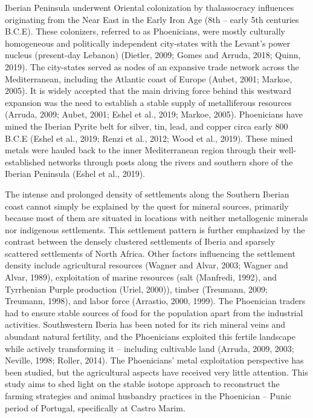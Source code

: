 \documentclass[5p]{elsarticle} %
\begin{document}
Iberian Peninsula underwent Oriental colonization by thalassocracy influences originating from the Near East in the Early Iron Age (8th -- early 5th centuries B.C.E). These colonizers, referred to as Phoenicians, were mostly culturally homogeneous and politically independent city-states with the Levant's power nucleus (present-day Lebanon) (Dietler, 2009; Gomes and Arruda, 2018; Quinn, 2019). The city-states served as nodes of an expansive trade network across the Mediterranean, including the Atlantic coast of Europe (Aubet, 2001; Markoe, 2005). It is widely accepted that the main driving force behind this westward expansion was the need to establish a stable supply of metalliferous resources (Arruda, 2009; Aubet, 2001; Eshel et al., 2019; Markoe, 2005). Phoenicians have mined the Iberian Pyrite belt for silver, tin, lead, and copper circa early 800 B.C.E (Eshel et al., 2019; Renzi et al., 2012; Wood et al., 2019). These mined metals were hauled back to the inner Mediterranean region through their well-established networks through posts along the rivers and southern shore of the Iberian Peninsula (Eshel et al., 2019).

The intense and prolonged density of settlements along the Southern Iberian coast cannot simply be explained by the quest for mineral sources, primarily because most of them are situated in locations with neither metallogenic minerals nor indigenous settlements. This settlement pattern is further emphasized by the contrast between the densely clustered settlements of Iberia and sparsely scattered settlements of North Africa. Other factors influencing the settlement density include agricultural resources (Wagner and Alvar, 2003; Wagner and Alvar, 1989), exploitation of marine resources (salt (Manfredi, 1992), and Tyrrhenian Purple production (Uriel, 2000)), timber (Treumann, 2009; Treumann, 1998), and labor force (Arrastio, 2000, 1999). The Phoenician traders had to ensure stable sources of food for the population apart from the industrial activities. Southwestern Iberia has been noted for its rich mineral veins and abundant natural fertility, and the Phoenicians exploited this fertile landscape while actively transforming it -- including cultivable land (Arruda, 2009, 2003; Neville, 1998; Roller, 2014). The Phoenicians' metal exploitation perspective has been studied, but the agricultural aspects have received very little attention. This study aims to shed light on the stable isotope approach to reconstruct the farming strategies and animal husbandry practices in the Phoenician -- Punic period of Portugal, specifically at Castro Marim.
\end{document}
